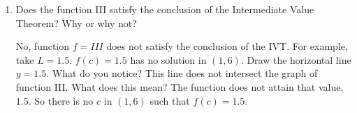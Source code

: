 \documentclass[nooutcomes]{ximera}
\begin{document}
\begin{problem}
\begin{enumerate}
\begin{enumerate}
	\item Does the function III satisfy the conclusion of the Intermediate Value Theorem?  Why or why not?
	\begin{freeResponse}
	No, function $f= III$ does not satisfy the conclusion of the IVT.  For example, take $L=1.5$.  $f(c)=1.5$ has no solution in $(1,6)$.  Draw the horizontal line $y=1.5$.  What do you notice?  This line does not intersect the graph of function III.  What does this mean?  The function does not attain that value, $1.5$.  So there is no $c$ in $(1,6)$ such that $f(c)=1.5$.
	\end{freeResponse}


	\end{enumerate}
\end{enumerate}

\end{problem}
\end{document}
